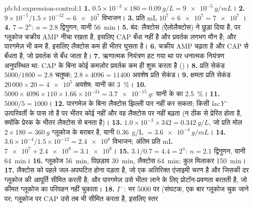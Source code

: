 \begin{solution}{pb:b1:expression-control:1}
\textbf{1.} $0.5\times 10^{-3}\times 180 = \qty{0.09}{g/L} =
\qty{9e-5}{g/mL}$।
\textbf{2.} $9\times 10^{-5}/1.5\times 10^{-12} = \num{6e7}$ विभाजन।
\textbf{3.} प्रति mL $10^7 + \num{6e7} = \num{7e7}$ ।
\textbf{4.} $7 = 2^n$: $n = 2.8$ द्विगुणन, यानी \qty{56}{min}।
\textbf{5.} बंद: लैक्टोस (ऐलोलैक्टोस) ने  छुड़ा दिया है,
पर ग्लूकोज चक्रीय AMP नीचा रखता है, इसलिए CAP बँधा नहीं है और प्रवर्तक
लगभग मौन है; और पारगमेज़ भी कम है, इसलिए लैक्टोस कम ही भीतर घुसता है।
\textbf{6.} चक्रीय AMP चढ़ता है और CAP से बँधता है, जो प्रवर्तक से बँध
जाता है।
\textbf{7.} ऋणात्मक नियंत्रण हट गया था पर धनात्मक नियंत्रण
अनुपस्थित था: CAP के बिना कोई कमज़ोर प्रवर्तक कम ही शुरू करता है
()।
\textbf{8.} प्रति सेकंड $5000/1800 = 2.8$ चतुष्क; $2.8\times 4096 =
\num{11400}$ अवशेष प्रति सेकंड।
\textbf{9.} क्षमता प्रति सेकंड $20\,000\times 20 = \num{4e5}$ अवशेष:
यानी  का \qty{3}{\%}।
\textbf{10.} $5000\times 4096\times 110\times 1.66\times 10^{-24} =
\qty{3.7e-15}{g}$: यानी  के  का \qty{2.5}{\%}।
\textbf{11.} $5000/5 = 1000$।
\textbf{12.} पारगमेज़ के बिना लैक्टोस झिल्ली पार नहीं कर सकता;
किसी \emph{lacY}$^-$ उत्परिवर्ती के पास  तो है पर भीतर कोई
 नहीं और वह लैक्टोस पर नहीं बढ़ता (न ठीक से प्रेरित होता है,
क्योंकि प्रेरक  के भीतर लैक्टोस से बनता है)।
\textbf{13.} $1.0\times 10^{-3}\times 342 = \qty{0.342}{g/L}$, जो प्रति
मोल $2\times 180 = \qty{360}{g}$ ग्लूकोज के बराबर है, यानी \qty{0.36}{g/L}
$= \qty{3.6e-4}{g/mL}$।
\textbf{14.} $3.6\times 10^{-4}/1.5\times 10^{-12} = \num{2.4e8}$
विभाजन; अंतिम प्रति mL $\num{7e7} + \num{2.4e8} = \num{3.1e8}$।
\textbf{15.} $3.1/0.7 = 4.4 = 2^n$: $n = 2.1$ द्विगुणन, यानी \qty{64}{min}।
\textbf{16.} ग्लूकोज \qty{56}{min}, पिछड़ाव \qty{30}{min}, लैक्टोस
\qty{64}{min}: कुल मिलाकर \qty{150}{min}।
\textbf{17.} लैक्टोस को पहले जल-अपघटित होना पड़ता है, जो एक अतिरिक्त
एंजाइमी चरण है और जिसकी दर ग्लूकोज की आपूर्ति सीमित करती है; और
पारगमेज़ उसे भीतर लाने के लिए प्रोटॉन-प्रवणता बरतती है, जो कीमत
ग्लूकोज का परिवहन नहीं चुकाता।
\textbf{18.} $I^-$:  भर \num{5000} पर (संघटक, एक बार
ग्लूकोज चुक जाने पर; ग्लूकोज पर CAP उसे तब भी सीमित करता है, इसलिए स्तर

\end{solution}
